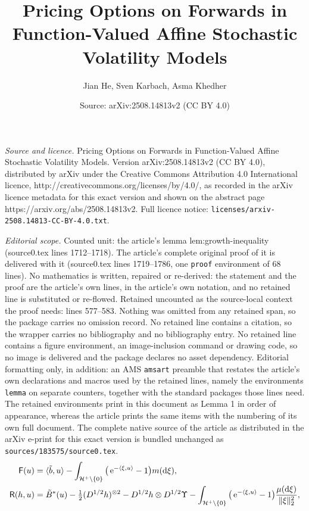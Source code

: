 \documentclass[10pt,a4paper]{amsart}
\title{Pricing Options on Forwards in Function-Valued Affine Stochastic Volatility Models}
\author{Jian He, Sven Karbach, Asma Khedher}
\date{Source: arXiv:2508.14813v2 (CC BY 4.0)}
\newcommand*\D{\mathop{}\!\mathrm{d}}
\newcommand*\E{\mathop{}\!\mathrm{e}}
\newcommand{\cH}{\mathcal{H}}
\newcommand{\cHplus}{\cH^{+}}
\newcommand{\cHpluso}{\cHplus\setminus \{0\}}
\newcommand{\norm}[1]{\|#1\|}
\begin{document}
\maketitle

\noindent\emph{Source and licence.} Pricing Options on Forwards in Function-Valued Affine Stochastic Volatility Models. Version arXiv:2508.14813v2 (CC BY 4.0), distributed by arXiv under the Creative Commons Attribution 4.0 International licence, http://creativecommons.org/licenses/by/4.0/, as recorded in the arXiv licence metadata for this exact version and shown on the abstract page https://arxiv.org/abs/2508.14813v2. Full licence notice: \texttt{licenses/arxiv-2508.14813-CC-BY-4.0.txt}.\par\smallskip

\noindent\textit{Editorial scope.} Counted unit: the article's lemma lem:growth-inequality (source0.tex lines 1712--1718). The article's complete original proof of it is delivered with it (source0.tex lines 1719--1786, one \texttt{proof} environment of 68 lines). No mathematics is written, repaired or re-derived: the statement and the proof are the article's own lines, in the article's own notation, and no retained line is substituted or re-flowed.  Retained uncounted as the source-local context the proof needs: lines 577--583.  Nothing was omitted from any retained span, so the package carries no omission record.  No retained line contains a citation, so the wrapper carries no bibliography and no bibliography entry.  No retained line contains a figure environment, an image-inclusion command or drawing code, so no image is delivered and the package declares no asset dependency.  Editorial formatting only, in addition: an AMS \texttt{amsart} preamble that restates the article's own declarations and macros used by the retained lines, namely the environments \texttt{lemma} on separate counters, together with the standard packages those lines need.  The retained environments print in this document as Lemma 1 in order of appearance, whereas the article prints the same items with the numbering of its own full document.  The complete native source of the article as distributed in the arXiv e-print for this exact version is bundled unchanged as \texttt{sources/183575/source0.tex}.
\begin{align}
 {\sf F}(u)&=\langle \tilde{b}, u\rangle - \int_{\cHpluso}\big(\E^{-\langle \xi, u\rangle}-1\big) m(\D \xi), \label{eq:F}\\
 {\sf R}(h,u)&= \tilde{B}^{*}(u)-\tfrac{1}{2}(D^{1/2}h)^{\otimes 2}
     -D^{1/2} h \otimes D^{1/2}\Upsilon 
    - \int_{\cHpluso}\big(\E^{-\langle
    \xi,u\rangle}-1\big)\frac{\mu(\D \xi)}{\norm{\xi}_2^{2}}, \label{eq:R}
\end{align}
\end{document}
